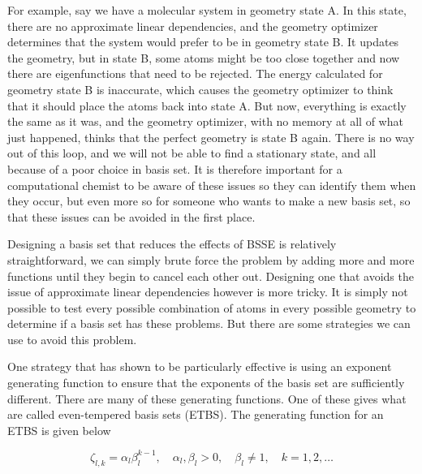 For example, say we have a molecular system in geometry state A. In this state, there are no approximate linear dependencies, and the geometry optimizer determines that the system would prefer to be in geometry state B. It updates the geometry, but in state B, some atoms might be too close together and now there are eigenfunctions that need to be rejected. The energy calculated for geometry state B is inaccurate, which causes the geometry optimizer to think that it should place the atoms back into state A. But now, everything is exactly the same as it was, and the geometry optimizer, with no memory at all of what just happened, thinks that the perfect geometry is state B again. There is no way out of this loop, and we will not be able to find a stationary state, and all because of a poor choice in basis set. It is therefore important for a computational chemist to be aware of these issues so they can identify them when they occur, but even more so for someone who wants to make a new basis set, so that these issues can be avoided in the first place.

Designing a basis set that reduces the effects of BSSE is relatively straightforward, we can simply brute force the problem by adding more and more functions until they begin to cancel each other out. Designing one that avoids the issue of approximate linear dependencies however is more tricky. It is simply not possible to test every possible combination of atoms in every possible geometry to determine if a basis set has these problems. But there are some strategies we can use to avoid this problem.

One strategy that has shown to be particularly effective is using an exponent generating function to ensure that the exponents of the basis set are sufficiently different. There are many of these generating functions. One of these gives what are called even-tempered basis sets (ETBS)\cite{ETBS}. The generating function for an ETBS is given below

\begin{equation}
\label{eq:ETBS_gen}
\zeta_{l,k} = \alpha_{l}\beta^{k-1}_{l}, \quad \alpha_{l}, \beta_{l} > 0, \quad \beta_{l} \neq 1, \quad k = 1, 2, \ldots
\end{equation}

